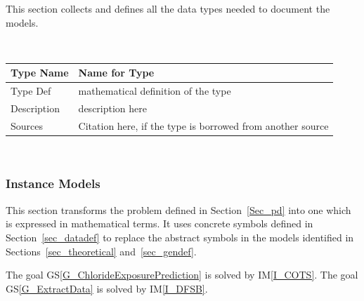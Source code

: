 \documentclass[12pt]{article}
\newcommand{\colAwidth}{0.13\textwidth}
\newcommand{\colBwidth}{0.82\textwidth}
\newcommand{\gsref}[1]{GS\ref{#1}}
\newcommand{\iref}[1]{IM\ref{#1}}
\begin{document}



This section collects and defines all the data types needed to document the
models. 

~\newline

\noindent
\begin{minipage}{\textwidth}
\renewcommand*{\arraystretch}{1.5}
\begin{tabular}{| p{\colAwidth} | p{\colBwidth}|}
  \hline
  \rowcolor[gray]{0.9}
  Type Name & Name for Type\\
  \hline
  Type Def & mathematical definition of the type\\
  \hline
  Description & description here
  \\
  \hline
  Sources & Citation here, if the type is borrowed from another source\\
  \hline
\end{tabular}
\end{minipage}\\


\subsubsection{Instance Models} \label{sec_instance}    

This section transforms the problem defined in Section~\ref{Sec_pd} into 
one which is expressed in mathematical terms. It uses concrete symbols defined 
in Section~\ref{sec_datadef} to replace the abstract symbols in the models 
identified in Sections~\ref{sec_theoretical} and~\ref{sec_gendef}.

The goal \gsref{G_ChlorideExposurePrediction} is solved by \iref{I_COTS}.
The goal \gsref{G_ExtractData} is solved by \iref{I_DFSB}.
\end{document}
